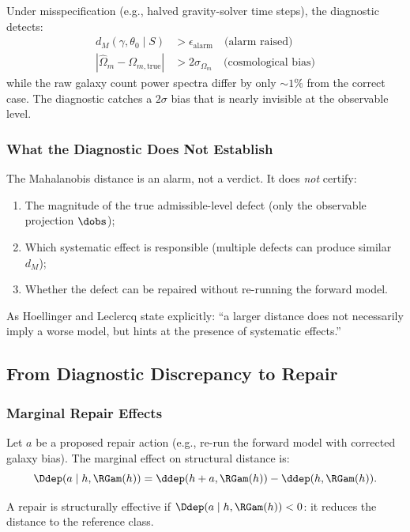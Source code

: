 Under misspecification (e.g., halved gravity-solver time steps), the diagnostic detects:
\begin{align*}
d_M(\gamma, \theta_0 \mid S) &> \epsilon_{\mathrm{alarm}} \quad \text{(alarm raised)} \\
|\hat\Omega_m - \Omega_{m,\mathrm{true}}| &> 2\sigma_{\Omega_m} \quad \text{(cosmological bias)}
\end{align*}
while the raw galaxy count power spectra differ by only $\sim 1\%$ from the correct case. The diagnostic catches a $2\sigma$ bias that is nearly invisible at the observable level.

\subsubsection{What the Diagnostic Does Not Establish}

The Mahalanobis distance is an alarm, not a verdict. It does \emph{not} certify:
\begin{enumerate}
\item The magnitude of the true admissible-level defect (only the observable projection $\dobs$);
\item Which systematic effect is responsible (multiple defects can produce similar $d_M$);
\item Whether the defect can be repaired without re-running the forward model.
\end{enumerate}

As Hoellinger and Leclercq state explicitly: ``a larger distance does not necessarily imply a worse model, but hints at the presence of systematic effects.''


\subsection{From Diagnostic Discrepancy to Repair}

\subsubsection{Marginal Repair Effects}

Let $a$ be a proposed repair action (e.g., re-run the forward model with corrected galaxy bias). The marginal effect on structural distance is:
\[
\Ddep(a \mid h, \RGam(h)) = \ddep(h + a, \RGam(h)) - \ddep(h, \RGam(h)).
\]

A repair is structurally effective if $\Ddep(a \mid h, \RGam(h)) < 0$: it reduces the distance to the reference class.

